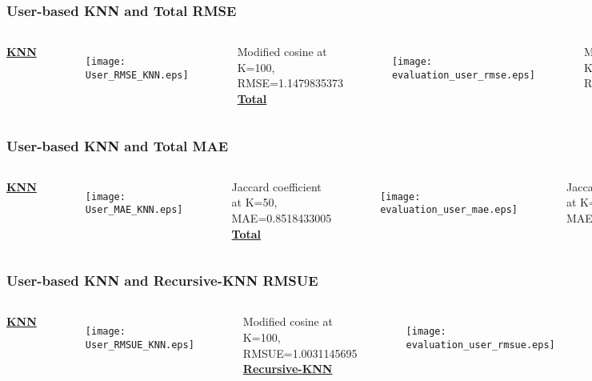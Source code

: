 \begin{frame}[t]
    \frametitle{User-based KNN and Total RMSE}
    \vspace{-0.7cm}
    \begin{columns}
        \centering
        \underline{\textbf{KNN}}
    \begin{figure}
    \centering
    \texttt{[image: User\_RMSE\_KNN.eps]}
    \end{figure}
    \centering
    \tiny
    Modified cosine at K=100, RMSE=1.1479835373
        \centering
        \underline{\textbf{Total}}
    \begin{figure}
    \centering
    \texttt{[image: evaluation\_user\_rmse.eps]}
    \end{figure}
    \centering
    \tiny
    Modified cosine at K=100 \& M=3, RMSE=1.1604146071
\end{columns}
\end{frame}
\begin{frame}[t]
    \frametitle{User-based KNN and Total MAE}
        \vspace{-0.7cm}
        \begin{columns}
            \centering
            \underline{\textbf{KNN}}
        \begin{figure}
        \centering
        \texttt{[image: User\_MAE\_KNN.eps]}
        \end{figure}
        \centering
        \tiny
        Jaccard coefficient at K=50, MAE=0.8518433005
            \centering
            \underline{\textbf{Total}}
        \begin{figure}
        \centering
        \texttt{[image: evaluation\_user\_mae.eps]}
        \end{figure}
        \centering
        \tiny
        Jaccard coefficient at K=50 \& M=3, MAE=0.854066176
    \end{columns}
\end{frame}
\begin{frame}[t]
    \frametitle{User-based KNN and Recursive-KNN RMSUE}
    \vspace{-0.7cm}
    \begin{columns}
        \centering
        \underline{\textbf{KNN}}
    \begin{figure}
    \centering
    \texttt{[image: User\_RMSUE\_KNN.eps]}
    \end{figure}
    \centering
    \tiny
    Modified cosine at K=100, RMSUE=1.0031145695
        \centering
        \underline{\textbf{Recursive-KNN}}
    \begin{figure}
    \centering
    \texttt{[image: evaluation\_user\_rmsue.eps]}
    \end{figure}
    \centering
    \tiny
    Modified cosine at K=100 \& M=3, RMSUE=0.9089525549
\end{columns}
\end{frame}

